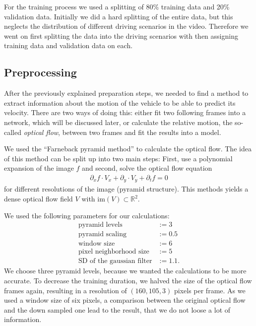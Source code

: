 \documentclass[conference]{IEEEtran}
\begin{document}
For the training process we used a splitting of 80\% training data and 20\% validation data. Initially 
we did a hard splitting of the entire data, but this neglects the distribution of different driving 
scenarios in the video. Therefore we went on first splitting the data into the driving scenarios with 
then assigning training data and validation data on each.

\subsection{Preprocessing}

After the previously explained preparation steps, we needed to find a method to extract information 
about the motion of the vehicle to be able to predict its velocity. There are two ways of doing this: 
either fit two following frames into a network, which will be discussed later, or calculate the relative 
motion, the so-called \emph{optical flow}, between two frames and fit the results into a model.

We used the \enquote{Farneback pyramid method} \cite{Farneback2003} to calculate the optical flow.
The idea of this method can be split up into two main steps: First, use a polynomial expansion of the 
image $f$ and second, solve the optical flow equation
\begin{align*}
\partial_x f \cdot V_x + \partial_y \cdot V_y + \partial_t f = 0
\end{align*}
for different resolutions of the image (pyramid structure). This methods yields a dense optical flow 
field $V$ with $\mathrm{im}(V) \subset \mathbb{R}^2$.

We used the following parameters for our calculations:
\begin{align*}
\text{pyramid levels} &:= 3 \\
\text{pyramid scaling} &:= 0.5\\
\text{window size} &:= 6\\
\text{pixel neighborhood size} &:= 5\\
\text{SD of the gaussian filter} &:= 1.1.
\end{align*}
We choose three pyramid levels, because we wanted the calculations to be more accurate. To decrease the 
training duration, we halved the size of the optical flow frames again, resulting in a resolution of
$(160,105,3)$ pixels per frame. As we used a window size of six pixels, a comparison between the 
original optical flow and the down sampled one lead to the result, that we do not loose a lot of 
information.
\end{document}
